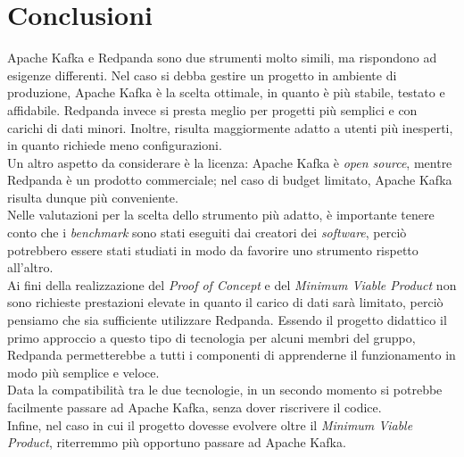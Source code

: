 \section{Conclusioni}
Apache Kafka e Redpanda sono due strumenti molto simili, ma rispondono ad esigenze differenti. Nel caso si debba gestire un progetto in ambiente di produzione, Apache Kafka è la scelta ottimale, in quanto è più stabile, testato e affidabile. Redpanda invece si presta meglio per progetti più semplici e con carichi di dati minori. Inoltre, risulta maggiormente adatto a utenti più inesperti, in quanto richiede meno configurazioni. \\
Un altro aspetto da considerare è la licenza: Apache Kafka è \textit{open source}, mentre Redpanda è un prodotto commerciale; nel caso di budget limitato, Apache Kafka risulta dunque più conveniente.\\
Nelle valutazioni per la scelta dello strumento più adatto, è importante tenere conto che i \textit{benchmark} sono stati eseguiti dai creatori dei \textit{software}, perciò potrebbero essere stati studiati in modo da favorire uno strumento rispetto all'altro.\\
Ai fini della realizzazione del \textit{Proof of Concept} e del \textit{Minimum Viable Product} non sono richieste prestazioni elevate in quanto il carico di dati sarà limitato, perciò pensiamo che sia sufficiente utilizzare Redpanda. Essendo il progetto didattico il primo approccio a questo tipo di tecnologia per alcuni membri del gruppo, Redpanda permetterebbe a tutti i componenti di apprenderne il funzionamento in modo più semplice e veloce.\\
Data la compatibilità tra le due tecnologie, in un secondo momento si potrebbe facilmente passare ad Apache Kafka, senza dover riscrivere il codice.\\
Infine, nel caso in cui il progetto dovesse evolvere oltre il \textit{Minimum Viable Product}, riterremmo più opportuno passare ad Apache Kafka.




